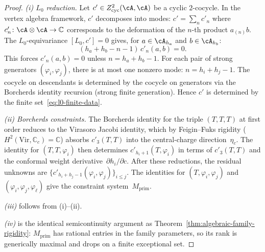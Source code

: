 \begin{proof}
\emph{(i) $L_0$ reduction.}
Let $c' \in Z^2_{\mathrm{cyc}}(\cA, \cA)$ be a cyclic $2$-cocycle.
In the vertex algebra framework, $c'$ decomposes into modes:
$c' = \sum_n c'_n$ where $c'_n\colon \cA \otimes \cA \to \mathbb{C}$
corresponds to the deformation of the $n$-th product
$a_{(n)}b$.  The $L_0$-equivariance $[L_0, c'] = 0$ gives,
for $a \in \cA_{h_a}$ and $b \in \cA_{h_b}$:
\[
(h_a + h_b - n - 1)\, c'_n(a, b) = 0.
\]
This forces $c'_n(a, b) = 0$ unless $n = h_a + h_b - 1$.
For each pair of strong generators $(\varphi_i, \varphi_j)$,
there is at most one nonzero mode: $n = h_i + h_j - 1$.
The cocycle on descendants is determined by the cocycle on
generators via the Borcherds identity recursion
(strong finite generation).
Hence $c'$ is determined by the finite
set~\eqref{eq:l0-finite-data}.

\smallskip
\emph{(ii) Borcherds constraints.}
The Borcherds identity for the triple
$(T, T, T)$ at first order reduces to the Virasoro Jacobi
identity, which by Feigin--Fuks rigidity
($H^2(\mathrm{Vir}, \mathbb{C}_c) = \mathbb{C}$)
absorbs $c'_3(T, T)$ into the central-charge
direction~$\eta_c$.  The identity for $(T, T, \varphi_i)$
then determines $c'_{h_i+1}(T, \varphi_i)$ in terms of
$c'_3(T, T)$ and the conformal weight
derivative~$\partial h_i / \partial c$.  After these
reductions, the residual unknowns are
$\{c'_{h_i+h_j-1}(\varphi_i, \varphi_j)\}_{i \leq j}$.
The identities for $(T, \varphi_i, \varphi_j)$ and
$(\varphi_i, \varphi_j, \varphi_\ell)$ give the
constraint system~$M_{\mathrm{prim}}$.

\smallskip
\emph{(iii)} follows from (i)--(ii).

\smallskip
\emph{(iv)} is the identical semicontinuity argument as
Theorem~\ref{thm:algebraic-family-rigidity}: $M_{\mathrm{prim}}$
has rational entries in the family parameters, so its rank is
generically maximal and drops on a finite exceptional set.
\end{proof}

